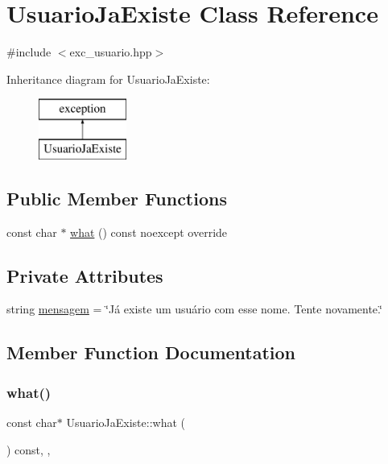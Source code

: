 \hypertarget{classUsuarioJaExiste}{}\section{Usuario\+Ja\+Existe Class Reference}
\label{classUsuarioJaExiste}


{\ttfamily \#include $<$exc\+\_\+usuario.\+hpp$>$}

Inheritance diagram for Usuario\+Ja\+Existe\+:\begin{figure}[H]
\begin{center}
\leavevmode
\includegraphics[height=2.000000cm]{classUsuarioJaExiste}
\end{center}
\end{figure}
\subsection*{Public Member Functions}
\begin{DoxyCompactItemize}
\item 
const char $\ast$ \hyperlink{classUsuarioJaExiste_abe722b380a1cb83ac87f350fbb5d5261}{what} () const noexcept override
\end{DoxyCompactItemize}
\subsection*{Private Attributes}
\begin{DoxyCompactItemize}
\item 
string \hyperlink{classUsuarioJaExiste_abd00539263f588798844b87f64eab9a7}{mensagem} = \char`\"{}Já existe um usuário com esse nome. Tente novamente.\char`\"{}
\end{DoxyCompactItemize}


\subsection{Member Function Documentation}
\mbox{\label{classUsuarioJaExiste_abe722b380a1cb83ac87f350fbb5d5261}} 
\subsubsection{\texorpdfstring{what()}{what()}}
{\footnotesize\ttfamily const char$\ast$ Usuario\+Ja\+Existe\+::what (\begin{DoxyParamCaption}{ }\end{DoxyParamCaption}) const\hspace{0.3cm}{\ttfamily [inline]}, {\ttfamily [override]}, {\ttfamily [noexcept]}}



